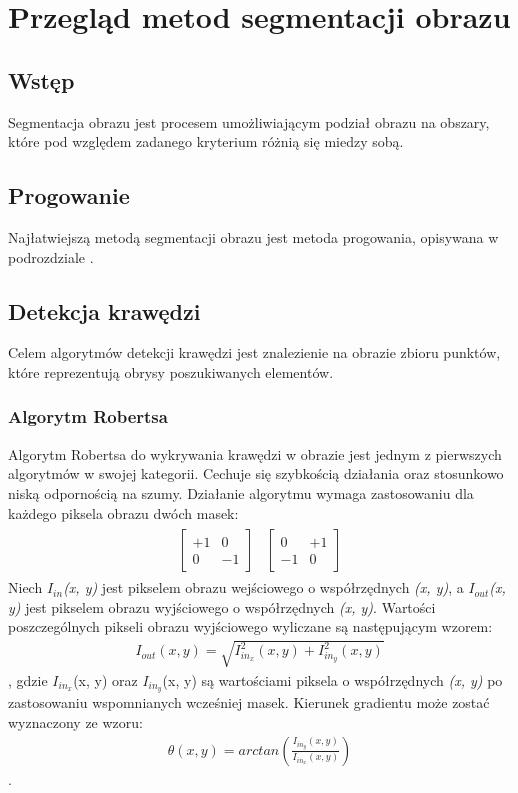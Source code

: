 \section{Przegląd metod segmentacji obrazu}
\subsection{Wstęp}
Segmentacja obrazu jest procesem umożliwiającym podział obrazu na obszary, które pod względem zadanego kryterium różnią się miedzy sobą. 
\subsection{Progowanie}
Najłatwiejszą metodą segmentacji obrazu jest metoda progowania, opisywana w podrozdziale .

\subsection{Detekcja krawędzi}
Celem algorytmów detekcji krawędzi jest znalezienie na obrazie zbioru punktów, które reprezentują obrysy poszukiwanych elementów. 

\subsubsection{Algorytm Robertsa}
Algorytm Robertsa do wykrywania krawędzi w obrazie jest jednym z pierwszych algorytmów w swojej kategorii. Cechuje się szybkością działania oraz stosunkowo niską odpornością na szumy. Działanie algorytmu wymaga zastosowaniu dla każdego piksela obrazu dwóch masek:
\begin{gather*}
\begin{matrix}
  \begin{bmatrix}
    +1 & 0 \\
    0 & -1
  \end{bmatrix}
&
  \begin{bmatrix}
    0 & +1 \\
    -1 & 0
  \end{bmatrix}
\end{matrix}
\end{gather*}
Niech \textit{$I_{in}$(x, y)} jest pikselem obrazu wejściowego o współrzędnych \textit{(x, y)}, a \textit{$I_{out}$(x, y)} jest pikselem obrazu wyjściowego o współrzędnych \textit{(x, y)}. Wartości poszczególnych pikseli obrazu wyjściowego wyliczane są następującym wzorem:
\begin{gather*}
  I_{out}(x, y) = \sqrt{I_{in_x}^2(x, y)+I_{in_y}^2(x, y)}
\end{gather*}, gdzie \textit{$I_{in_x}$}(x, y) oraz \textit{$I_{in_y}$}(x, y) są wartościami piksela o współrzędnych \textit{(x, y)} po zastosowaniu wspomnianych wcześniej masek.
Kierunek gradientu może zostać wyznaczony ze wzoru:
\begin{gather*}
  \theta(x, y) = arctan(\frac{I_{in_y}(x, y)}{I_{in_x}(x, y)})
\end{gather*}.
